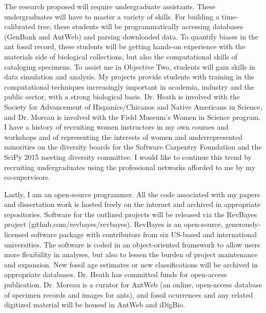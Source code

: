 \documentclass[]{article}
\begin{document}
The research proposed will require undergraduate assistants. These undergraduates will have to master a variety of skills. For building a time-calibrated tree, these students will be programmatically accessing databases (GenBank and AntWeb) and parsing downloaded data. To quantify biases in the ant fossil record, these students will be getting hands-on experience with the materials side of biological collections, but also the computational skills of cataloging specimens. To assist me in Objective Two, students will gain skills in data simulation and analysis. My projects provide students with training in the computational techniques increasingly important in academia, industry and the public sector, with a strong biological basis. Dr. Heath is involved with the Society for Advancement of Hispanics/Chicanos and Native Americans in Science, and Dr. Moreau is involved with the Field Museum's Women in Science program. I have a history of recruiting women instructors in my own courses and workshops and of representing the interests of women and underrepresented minorities on the diversity boards for the Software Carpentry Foundation and the SciPy 2015 meeting diversity committee. I would like to continue this trend by recruiting undergraduates using the professional networks afforded to me by my co-supervisors.\par
Lastly, I am an open-source programmer. All the code associated with my papers and dissertation work is hosted freely on the internet and archived in appropriate repositories. Software for the outlined projects will be released via the RevBayes project (github.com/revbayes/revbayes). RevBayes is an open-source, generously-licensed software package with contributors from six US-based and international universities. The software is coded in an object-oriented framework to allow users more flexibility in analyses, but also to lessen the burden of project maintenance and expansion. New fossil age estimates or new classifications will be archived in appropriate databases. Dr. Heath has committed funds for open-access publication. Dr. Moreau is a curator for AntWeb (an online, open-access database of specimen records and images for ants), and fossil ocurrences and any related digitized material will be housed in AntWeb and iDigBio. \par
	
\end{document}
